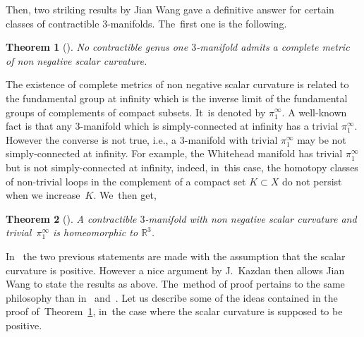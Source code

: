 \documentclass[10pt,a4paper]{amsart}
\numberwithin{equation}{section}
\newtheorem{theor}{Theorem}[section]
\begin{document}
Then, two striking results by Jian Wang gave a definitive answer for certain classes of contractible $3$-manifolds. The~first one is the following.

\begin{theor}[\cite{Wang1}]\label{Wang1}
No contractible genus one $3$-manifold admits a complete metric of non negative scalar curvature.
\end{theor}

The existence of complete metrics of non negative scalar curvature is related to the fundamental group at infinity which is the inverse limit of the fundamental groups of complements of compact subsets. It~is denoted by $\pi_1^{\infty}$. A well-known fact is that any $3$-manifold which is simply-connected at infinity has a trivial $\pi^\infty_1$. However the converse is not true, i.e., a $3$-manifold with trivial $\pi_{1}^{\infty}$ may be not simply-connected at infinity. For example, the Whitehead manifold has trivial $\pi_{1}^{\infty}$ but is not simply-connected at infinity, indeed, in~this case, the homotopy classes of non-trivial loops in
the complement of a compact set $K\subset X$ do not persist when we increase~$K$. We~then get,

\begin{theor}[\cite{Wang2}]\label{Wang2}
A contractible $3$-manifold with non negative scalar curvature and trivial~$\pi_1^{\infty}$ is homeomorphic to $\mathbb{R}^{3}$.
\end{theor}

In~\cite{Wang1, Wang2} the two previous statements are made with the assumption that the scalar curvature is positive. However a nice argument by J.~Kazdan then allows Jian Wang to state the results as above. The~method
of proof pertains to the same philosophy than in~\cite{SchoenYau:stable} and~\cite{GromovLawson}. Let us describe some of the ideas contained in the proof of~Theorem~\ref{Wang1}, in~the case where the scalar curvature is supposed to be positive.
\end{document}
